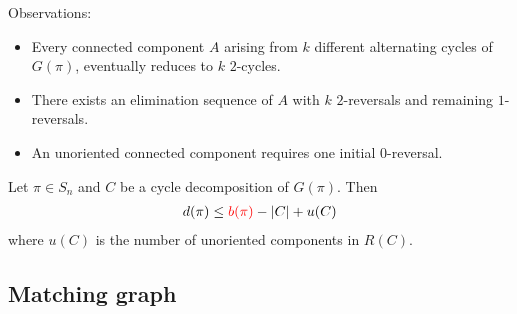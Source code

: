 \documentclass{beamer}
\theoremstyle{definition}
\def\spadding{\vspace{0.25cm}}
\def\r{\textcolor{red}}
\begin{document}

\begin{frame}



Observations:
\begin{itemize}
    \item Every connected component $A$ arising from $k$ different alternating cycles of $G(\pi)$, eventually reduces to $k$ $2$-cycles.\pause
    \item There exists an elimination sequence of $A$ with $k$ $2$-reversals and remaining $1$-reversals.\pause
    \item An unoriented connected component requires one initial $0$-reversal.
\end{itemize}\spadding\pause

\begin{theorem}
\label{thm:4}
Let $\pi \in S_n$ and $C$ be a cycle decomposition of $G(\pi)$. Then
\begin{align*}
    d(\pi) \leq \r{b(\pi)} - |C| + u(C)
\end{align*}
where $u(C)$ is the number of unoriented components in $R(C)$.
\end{theorem}

\end{frame}

\subsection{Matching graph}
\end{document}
